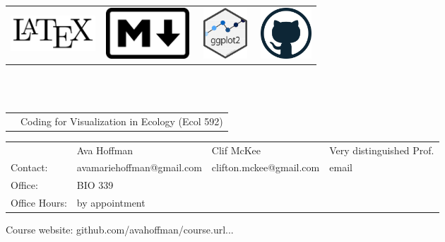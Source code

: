 \documentclass[11pt]{article}
\begin{document}
\begin{tabular}{ c | c | c | c }
{\includegraphics[height=0.75in,width=1.25in]{latex.png}} & 
{\includegraphics[height=0.75in,width=1.25in]{markdown.png}} &
{\includegraphics[height=0.75in,width=0.75in]{ggplot2.png}} &
{\includegraphics[height=0.75in,width= 0.75in]{github.png}} 
\end{tabular} 
\\\\

\begin{tabular}{ l l }
  & \LARGE Coding for Visualization in Ecology (Ecol 592) \\
\end{tabular}
\vspace{10mm}

\begin{tabular}{ l l l l } %
  & \large Ava Hoffman & Clif McKee & Very distinguished Prof. \\
  Contact: & \footnotesize avamariehoffman@gmail.com & \footnotesize clifton.mckee@gmail.com & \footnotesize email\\
  Office:  & BIO 339 & & \\
  Office Hours: & by appointment & &
  \end{tabular}
\vspace{5mm}
\begin{center}   \LARGE Course website: github.com/avahoffman/course.url... \\
\end{center}
\end{document}
